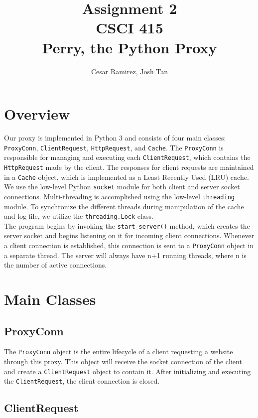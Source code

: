 \documentclass{report}
\title{Assignment 2\\CSCI 415\\Perry, the Python Proxy}
\author{Cesar Ramirez, Josh Tan}
\begin{document}
\maketitle

\section*{Overview}

Our proxy is implemented in Python 3 and consists of four main classes: \texttt{ProxyConn}, \texttt{ClientRequest}, \texttt{HttpRequest}, and \texttt{Cache}. The \texttt{ProxyConn} is responsible for managing and executing each \texttt{ClientRequest}, which contains the \texttt{HttpRequest} made by the client. The responses for client requests are maintained in a \texttt{Cache} object, which is implemented as a Least Recently Used (LRU) cache. We use the low-level Python \texttt{socket} module for both client and server socket connections. Multi-threading is accomplished using the low-level \texttt{threading} module. To synchronize the different threads during manipulation of the cache and log file, we utilize the \texttt{threading.Lock} class.\\

The program begins by invoking the \texttt{start\_server()} method, which creates the server socket and begins listening on it for incoming client connections. Whenever a client connection is established, this connection is sent to a \texttt{ProxyConn} object in a separate thread. The server will always have n+1 running threads, where n is the number of active connections.

\section*{Main Classes}

\subsection*{ProxyConn}

The \texttt{ProxyConn} object is the entire lifecycle of a client requesting a website through this proxy. This object will receive the socket connection of the client and create a \texttt{ClientRequest} object to contain it. After initializing and executing the \texttt{ClientRequest}, the client connection is closed.

\subsection*{ClientRequest}
\end{document}
